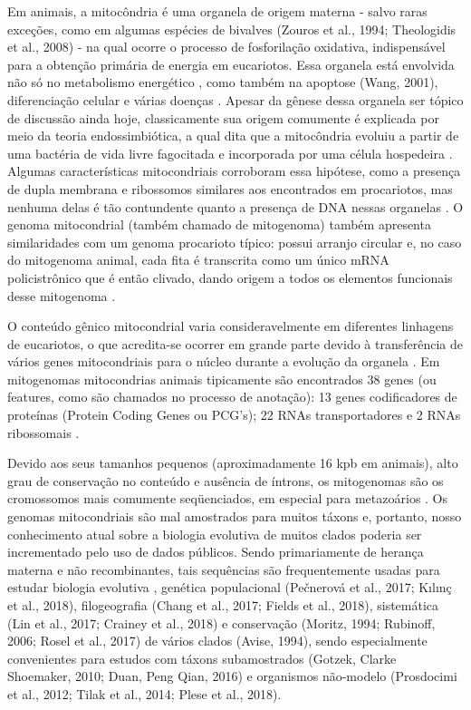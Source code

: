 \documentclass[../DISSERTACAO_MAIN.tex]{subfiles}
\begin{document}
Em animais, a mitocôndria é uma organela de origem materna  - salvo raras exceções, como em algumas espécies de bivalves (Zouros et al., 1994; Theologidis et al., 2008) - na qual ocorre o processo de fosforilação oxidativa, indispensável para a obtenção primária de energia em eucariotos. Essa organela está envolvida não só no metabolismo energético \cite{Brand1997}, como também na apoptose (Wang, 2001), diferenciação celular \cite{Wanet2015} e várias doenças \cite{Chan2006}. Apesar da gênese dessa organela ser tópico de discussão ainda hoje, classicamente sua origem comumente é explicada por meio da teoria endossimbiótica, a qual dita que a mitocôndria evoluiu a partir de uma bactéria de vida livre fagocitada e incorporada por uma célula hospedeira \cite{Gray2017}. Algumas características mitocondriais corroboram essa hipótese, como a presença de dupla membrana e ribossomos similares aos encontrados em procariotos, mas nenhuma delas é tão contundente quanto a presença de DNA nessas organelas \cite{Gray1999, Kutschera2005} . O genoma mitocondrial (também chamado de mitogenoma) também apresenta similaridades com um genoma procarioto típico: possui arranjo circular e, no caso do mitogenoma animal, cada fita é transcrita como um único mRNA policistrônico que é então clivado, dando origem a todos os elementos funcionais desse mitogenoma \cite{Boore1999}.

O conteúdo gênico mitocondrial varia consideravelmente em diferentes linhagens de eucariotos, o que acredita-se ocorrer em grande parte devido à transferência de vários genes mitocondriais para o núcleo durante a evolução da organela \cite{Adams2003}. Em mitogenomas mitocondrias animais tipicamente são encontrados 38 genes (ou features, como são chamados no processo de anotação): 13 genes codificadores de proteínas (Protein Coding Genes ou PCG’s); 22 RNAs transportadores e 2 RNAs ribossomais \cite{Wolstenholme1992, Boore1999}.

Devido aos seus tamanhos pequenos (aproximadamente 16 kpb em animais), alto grau de conservação no conteúdo e ausência de íntrons, os mitogenomas são os cromossomos mais comumente seqüenciados, em especial para metazoários \cite{Smith2016}. Os genomas mitocondriais são mal amostrados para muitos táxons e, portanto, nosso conhecimento atual sobre a biologia evolutiva de muitos clados poderia ser incrementado pelo uso de dados públicos. Sendo primariamente de herança materna e não recombinantes, tais sequências são frequentemente usadas para estudar biologia evolutiva \cite{Finstermeier2013, Krzeminska2018},  genética populacional (Pečnerová et al., 2017; Kılınç et al., 2018), filogeografia (Chang et al., 2017; Fields et al., 2018), sistemática (Lin et al., 2017; Crainey et al., 2018) e conservação (Moritz, 1994; Rubinoff, 2006; Rosel et al., 2017) de vários clados (Avise, 1994), sendo especialmente convenientes para estudos com táxons subamostrados (Gotzek, Clarke  Shoemaker, 2010; Duan, Peng  Qian, 2016) e organismos não-modelo (Prosdocimi et al., 2012; Tilak et al., 2014; Plese et al., 2018).
\end{document}

